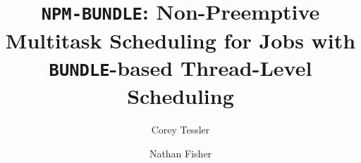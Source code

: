 \documentclass[a4paper,UKenglish,cleveref,autoref,english]{lipics-v2019}
\title{\texttt{NPM-BUNDLE}: Non-Preemptive Multitask Scheduling for
  Jobs with \texttt{BUNDLE}-based Thread-Level Scheduling}
\author{Corey Tessler}
       {Wayne State University, Detroit, Michigan, United States}
       {corey.tessler@wayne.edu}
       {}
       {}
\author{Nathan Fisher}
       {Wayne State University, Detroit, Michigan, United States}
       {fishern@wayne.edu}
       {}
       {}
\begin{document}
\maketitle


\newcommand{\BRT}{\ensuremath{\mathbb{B}}}
\newcommand{\CPI}{\ensuremath{\mathbb{I}}}
\newcommand{\tasks}{\ensuremath{\tau}}
\newcommand{\task}[1]{\ensuremath{\tau_{#1}}}
\newcommand{\period}[1]{\ensuremath{p_{#1}}}
\newcommand{\deadline}[1]{\ensuremath{d_{#1}}}
\newcommand{\Deadline}[1]{\ensuremath{D_{#1}}}
\newcommand{\taskthreads}[1]{\ensuremath{m_{#1}}}
\newcommand{\wcet}[2]{\ensuremath{c_{#1}{(#2)}}}
\newcommand{\object}[1]{\ensuremath{o_{#1}}}
\newcommand{\slack}[1]{\text{\sc{slack}(#1)}}
\newcommand{\dbf}[2]{\text{\sc{dbf}(#1,#2)}}
\newcommand{\hp}{\ensuremath{P}}

\newcommand{\supi}[1]{\ensuremath{\hat{#1}}}
\newcommand{\supts}{\ensuremath{\hat{\tau}}}
\newcommand{\ants}{\ensuremath{\hat{\tau}}}
\newcommand{\ant}[1]{\ensuremath{\hat{\task{}}_#1}}

\newcommand{\pd}{\ensuremath{\Delta_{max}}}
\newcommand{\algdivide}[2]{\text{\sc{divide}(#1,#2)}}
\newcommand{\texdivide}{\text{\sc{divide}}}
%
\newcommand{\Partial}[1]{\ensuremath{\Phi_{#1}}}

\newcommand{\GFactor}{\ensuremath{\mathbb{F}}}

\newcommand{\npchunks}{\text{\sc{np-chunks}}}
\newcommand{\bng}{\text{\sc{bnc}}}
\newcommand{\tpj}{\text{\sc{tpj}}}
\end{document}
